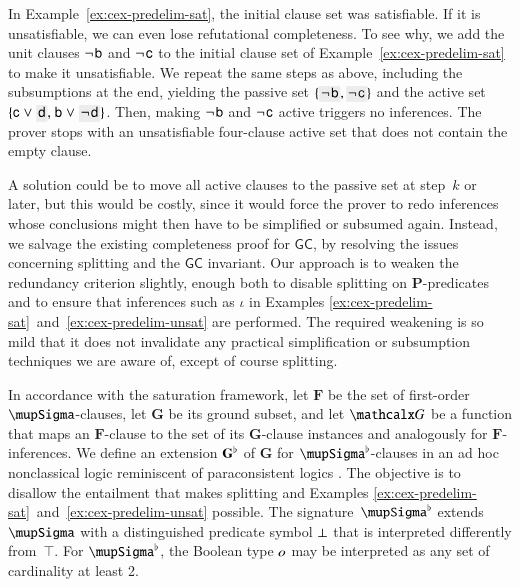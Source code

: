 \begin{rep}
\begin{exa}
\label{ex:cex-predelim-unsat}
In Example~\ref{ex:cex-predelim-sat}, the initial clause set was satisfiable.
If it is unsatisfiable, we can even lose refutational
completeness. To see why, we add the unit clauses
$\neg{\kern.2ex \mathsf{b}}$ and $\neg{\kern.2ex \mathsf{c}}$ to the initial clause set of
Example~\ref{ex:cex-predelim-sat} to make it unsatisfiable. We repeat the same
steps as above, including the subsumptions at the end,
yielding the passive set $\{\MAX{\neglit{\cst{b}}}, \MAX{\neglit{\cst{c}}}\}$ and
the active set $\{\cst{c} \cor \MAX{\cst{d}}{,}\; \cst{b} \cor \MAX{\neglit{\cst{d}}}\}$. Then,
making $\neg{\kern.2ex \mathsf{b}}$ and $\neg{\kern.2ex \mathsf{c}}$ active triggers no
inferences. The prover stops with an
unsatisfiable four-clause active set that does not contain the empty clause.
\end{exa}

A solution could be to move all active clauses to the passive set at step~$k$
or later, but this would be costly, since it would force the prover to redo
inferences whose conclusions might then have to be simplified or subsumed again.
Instead, we salvage the existing completeness proof for $\mathsf{GC}$, by
resolving the issues concerning splitting and the $\mathsf{GC}$ invariant. Our
approach is to weaken the redundancy criterion slightly, enough both to disable
splitting on $\mathbf{P}$-predicates and to ensure that
inferences such as $\iota$ in Examples
\ref{ex:cex-predelim-sat}~and~\ref{ex:cex-predelim-unsat} are performed. The
required weakening is so mild that it does not invalidate any practical
simplification or subsumption techniques we are aware of, except of course
splitting.

In accordance with the saturation framework, let $\mathbf{F}$ be the set of
first-order $\mupSigma$-clauses, let $\mathbf{G}$ be its ground subset,
and let $\gnd$ be a function that maps an $\mathbf{F}$-clause to the set of its
$\mathbf{G}$-clause instances and analogously for $\mathbf{F}$-inferences. We
define an extension $\mathbf{G}^\flat$ of $\mathbf{G}$ for
$\mupSigma\Wksup$-clauses in an ad hoc nonclassical logic reminiscent
of paraconsistent logics \cite{carnielli-et-al-2007}. The objective is to
disallow the entailment that makes splitting and Examples
\ref{ex:cex-predelim-sat}~and~\ref{ex:cex-predelim-unsat} possible.
%
The signature~$\mupSigma\Wksup$ extends $\mupSigma$ with a
distinguished predicate symbol $\bot$ that is interpreted differently
from~$\top$. For $\mupSigma\Wksup$, the Boolean type $o$ may be
interpreted as any set of cardinality at least 2.


\end{rep}
